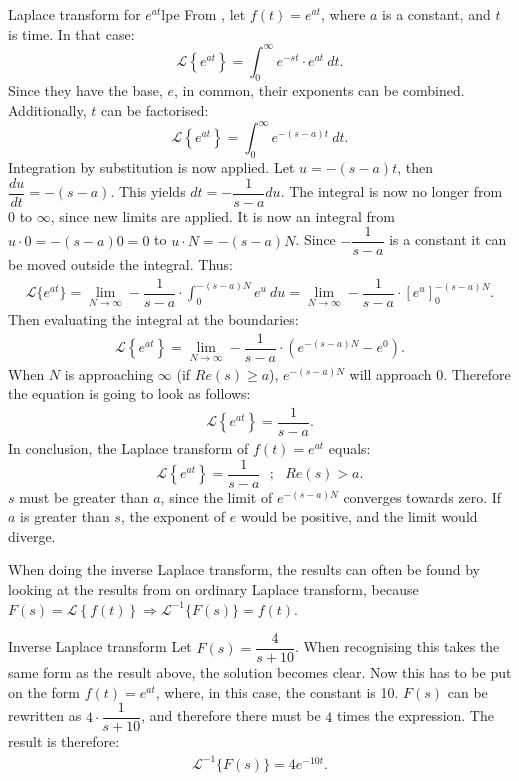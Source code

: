 \begin{example}{Laplace transform for $e^{at}$}{lpe}
From , let $f(t)=e^{at}$, where $a$ is a constant, and $t$ is time. In that case:
$$\mathcal{L} \left\{e^{at} \right\}=\int_{0}^{\infty} e^{-st}\cdot e^{at}\ dt.$$
Since they have the base, $e$, in common, their exponents can be combined. Additionally, $t$ can be factorised:
$$\mathcal{L} \left\{e^{at} \right\}=\int_{0}^{\infty} e^{-(s-a)t}\ dt.$$
Integration by substitution is now applied. Let $u = -(s-a)t$, then $\dfrac{du}{dt}=-(s-a)$. This yields $dt=-\dfrac{1}{s-a}du$. The integral is now no longer from 0 to $\infty$, since new limits are applied. It is now an integral from $u \cdot 0=-(s-a)0=0$ to $u\cdot N=-(s-a)N$. Since $-\dfrac{1}{s-a}$ is a constant it can be moved outside the integral. Thus:
\begin{align*}
\mathcal{L}\{e^{at}\}=\lim_{N \to \infty} -\dfrac{1}{s-a} \cdot \int_{0}^{-(s-a)N} e^{u} \ du = \lim_{N \to \infty} -\dfrac{1}{s-a} \cdot \left[e^{u} \right]_{0}^{-(s-a)N}.
\end{align*}
Then evaluating the integral at the boundaries:
\begin{align*}
\mathcal{L} \left\{e^{at} \right\} =\lim_{N \to \infty} -\dfrac{1}{s-a}\cdot (e^{-(s-a)N}-e^{0}).
\end{align*}
When $N$ is approaching $\infty$ (if $Re(s) \geq a$), $e^{-(s-a)N}$ will approach $0$. Therefore the equation is going to look as follows:
\begin{align*}
\mathcal{L} \left\{e^{at} \right\} = \dfrac{1}{s-a}.
\end{align*}
In conclusion, the Laplace transform of $f(t)=e^{at}$ equals:
$$\mathcal{L} \left\{e^{at} \right\} =\dfrac{1}{s-a} \ \ \ ;\ \ \ Re(s)>a.$$
$s$ must be greater than $a$, since the limit of $e^{-(s-a)N}$ converges towards zero. If $a$ is greater than $s$, the exponent of $e$ would be positive, and the limit would diverge.
\end{example}
\noindent When doing the inverse Laplace transform, the results can often be found by looking at the results from on ordinary Laplace transform, because $F(s) = \mathcal{L}\left\{f(t)\right\} \Rightarrow\mathcal{L}^{-1}\big\{ F(s)\big\} = f(t)$.
\\
\begin{example}{Inverse Laplace transform}{}
Let $F(s) = \dfrac{4}{s+10}$. When recognising this takes the same form as the result above, the solution becomes clear. Now this has to be put on the form $f(t)=e^{at}$, where, in this case, the constant is 10. $F(s)$ can be rewritten as $4 \cdot \dfrac{1}{s+10}$, and therefore there must be $4$ times the expression. The result is therefore:
\begin{align*}
\mathcal{L}^{-1} \big\{F(s) \big\} = 4e^{-10t}.
\end{align*}
\end{example}
